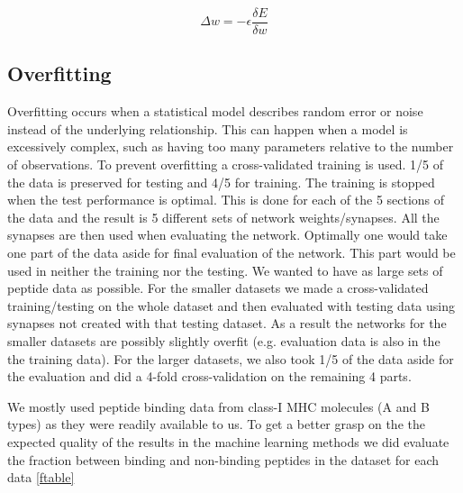 \begin{equation}
\Delta w = -\epsilon \frac{\delta E}{\delta w}
\end{equation}

\subsection*{Overfitting}
Overfitting occurs when a statistical model describes random error or noise instead of the underlying relationship.
This can happen when a model is excessively complex, such as having too many parameters relative to the number of observations.
To prevent overfitting a cross-validated training is used. 1/5 of the data is preserved for testing and 4/5 for training. 
The training is stopped when the test performance is optimal. This is done for each of the 5 sections of the data and the result is 5 different sets of network weights/synapses.
All the synapses are then used when evaluating the network.
Optimally one would take one part of the data aside for final evaluation of the network. This part would be used in neither the training nor the testing.
We wanted to have as large sets of peptide data as possible. For the smaller datasets we made a cross-validated training/testing on the whole dataset and then evaluated with testing data using synapses not created with that testing dataset.
As a result the networks for the smaller datasets are possibly slightly overfit (e.g. evaluation data is also in the the training data).
For the larger datasets, we also took 1/5 of the data aside for the evaluation and did a 4-fold cross-validation on the remaining 4 parts.

We mostly used peptide binding data from class-I MHC molecules (A and B types) as they were readily available to us.
To get a better grasp on the the expected quality of the results in the machine learning methods we did evaluate the fraction between binding and non-binding peptides in the dataset for each data {\ref{ftable}}

